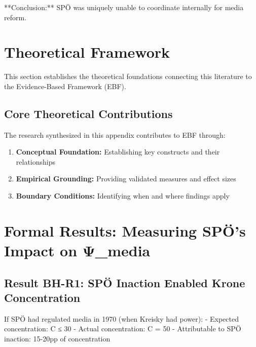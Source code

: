 **Conclusion:** SPÖ was uniquely unable to coordinate internally for media reform.



\section{Theoretical Framework}
\label{sec:theory}

This section establishes the theoretical foundations connecting this literature
to the Evidence-Based Framework (EBF).

\subsection{Core Theoretical Contributions}

The research synthesized in this appendix contributes to EBF through:

\begin{enumerate}
    \item \textbf{Conceptual Foundation:} Establishing key constructs and their relationships
    \item \textbf{Empirical Grounding:} Providing validated measures and effect sizes
    \item \textbf{Boundary Conditions:} Identifying when and where findings apply
\end{enumerate}

\section*{Formal Results: Measuring SPÖ's Impact on Ψ_media}

\subsection*{Result BH-R1: SPÖ Inaction Enabled Krone Concentration}

If SPÖ had regulated media in 1970 (when Kreisky had power):
- Expected concentration: C ≤ 30%
- Actual concentration: C = 50%
- Attributable to SPÖ inaction: 15-20pp of concentration

